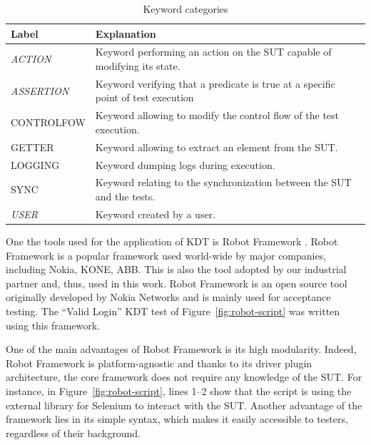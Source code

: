 \begin{table}
\caption{Keyword categories}
\label{keywords_categories}
\centering
\begin{tabular}{>{\raggedright}m{0.9in}>{\raggedright}m{4in}}
\toprule
\textbf{\scriptsize{Label}} & \textbf{\scriptsize{Explanation}}\tabularnewline
\toprule

\scriptsize{\textit{ACTION}} & \scriptsize{Keyword performing an action on the
SUT capable of modifying its state.} \tabularnewline

\scriptsize{\textit{ASSERTION}} & \scriptsize{Keyword verifying that a predicate
is true at a specific point of test execution} \tabularnewline

\scriptsize{CONTROLFOW} & \scriptsize{Keyword allowing to modify the
                                   control flow of the test execution.} \tabularnewline

\scriptsize{GETTER} & \scriptsize{Keyword allowing to extract an element from
the SUT.} \tabularnewline

\scriptsize{LOGGING} & \scriptsize{Keyword dumping logs during execution.}
\tabularnewline

\scriptsize{SYNC} & \scriptsize{Keyword relating to the
                                  synchronization between the SUT and the tests.} \tabularnewline

\scriptsize{\textit{USER}} & \scriptsize{Keyword created by a user.}
\tabularnewline

\bottomrule
\end{tabular}
\end{table}


One the tools used for the application of KDT is Robot Framework \cite{RobotFramework2020}. Robot Framework is a popular framework used world-wide by major companies, including Nokia, KONE, ABB. This is also the tool adopted by our industrial partner and, thus, used in this work. Robot Framework is an open source tool originally developed by Nokia Networks and is mainly used for acceptance testing. The ``Valid Login'' KDT test of Figure~\ref{fig:robot-script} was written using this framework.

One of the main advantages of Robot Framework is its high modularity.  Indeed, Robot Framework is platform-agnostic and thanks to its driver plugin architecture, the core framework does not require any knowledge of the SUT. For instance, in Figure~\ref{fig:robot-script}, lines 1--2 show that the script is using the external library for Selenium to interact with the SUT. Another advantage of the framework lies in its simple syntax, which makes it easily accessible to testers, regardless of their background.

